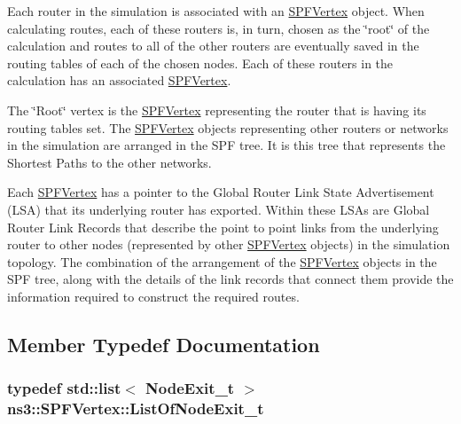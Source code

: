 Each router in the simulation is associated with an \hyperlink{classns3_1_1SPFVertex}{S\+P\+F\+Vertex} object. When calculating routes, each of these routers is, in turn, chosen as the \char`\"{}root\char`\"{} of the calculation and routes to all of the other routers are eventually saved in the routing tables of each of the chosen nodes. Each of these routers in the calculation has an associated \hyperlink{classns3_1_1SPFVertex}{S\+P\+F\+Vertex}.

The \char`\"{}\+Root\char`\"{} vertex is the \hyperlink{classns3_1_1SPFVertex}{S\+P\+F\+Vertex} representing the router that is having its routing tables set. The \hyperlink{classns3_1_1SPFVertex}{S\+P\+F\+Vertex} objects representing other routers or networks in the simulation are arranged in the S\+PF tree. It is this tree that represents the Shortest Paths to the other networks.

Each \hyperlink{classns3_1_1SPFVertex}{S\+P\+F\+Vertex} has a pointer to the Global Router Link State Advertisement (L\+SA) that its underlying router has exported. Within these L\+S\+As are Global Router Link Records that describe the point to point links from the underlying router to other nodes (represented by other \hyperlink{classns3_1_1SPFVertex}{S\+P\+F\+Vertex} objects) in the simulation topology. The combination of the arrangement of the \hyperlink{classns3_1_1SPFVertex}{S\+P\+F\+Vertex} objects in the S\+PF tree, along with the details of the link records that connect them provide the information required to construct the required routes. 

\subsection{Member Typedef Documentation}
\subsubsection[{\texorpdfstring{List\+Of\+Node\+Exit\+\_\+t}{ListOfNodeExit_t}}]{\setlength{\rightskip}{0pt plus 5cm}typedef {\bf std\+::list}$<$ {\bf Node\+Exit\+\_\+t} $>$ {\bf ns3\+::\+S\+P\+F\+Vertex\+::\+List\+Of\+Node\+Exit\+\_\+t}\hspace{0.3cm}{\ttfamily [private]}}\hypertarget{classns3_1_1SPFVertex_a58c08273e2ed8ce059f70c6afcf89e3f}{}\label{classns3_1_1SPFVertex_a58c08273e2ed8ce059f70c6afcf89e3f}


